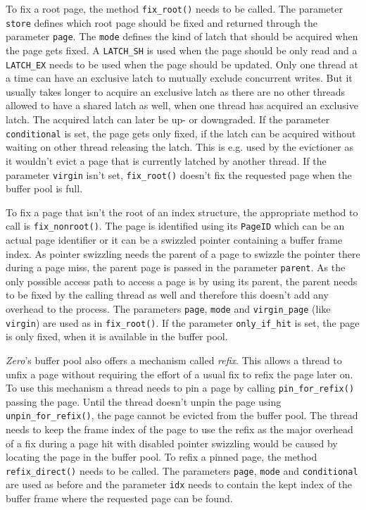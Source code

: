 	To fix a root page, the method \lstinline{fix_root()} needs to be called. The parameter \lstinline{store} defines which root page should be fixed and returned through the parameter \lstinline{page}. The \lstinline{mode} defines the kind of latch that should be acquired when the page gets fixed. A \lstinline{LATCH_SH} is used when the page should be only read and a \lstinline{LATCH_EX} needs to be used when the page should be updated. Only one thread at a time can have an exclusive latch to mutually exclude concurrent writes. But it usually takes longer to acquire an exclusive latch as there are no other threads allowed to have a shared latch as well, when one thread has acquired an exclusive latch. The acquired latch can later be up- or downgraded. If the parameter \lstinline{conditional} is set, the page gets only fixed, if the latch can be acquired without waiting on other thread releasing the latch. This is e.g. used by the evictioner as it wouldn't evict a page that is currently latched by another thread. If the parameter \lstinline{virgin} isn't set, \lstinline{fix_root()} doesn't fix the requested page when the buffer pool is full.

	To fix a page that isn't the root of an index structure, the appropriate method to call is \lstinline{fix_nonroot()}. The page is identified using its \lstinline{PageID} which can be an actual page identifier or it can be a swizzled pointer containing a buffer frame index. As pointer swizzling needs the parent of a page to swizzle the pointer there during a page miss, the parent page is passed in the parameter \lstinline{parent}. As the only possible access path to access a page is by using its parent, the parent needs to be fixed by the calling thread as well and therefore this doesn't add any overhead to the process. The parameters \lstinline{page}, \lstinline{mode} and \lstinline{virgin_page} (like \lstinline{virgin}) are used as in \lstinline{fix_root()}. If the parameter \lstinline{only_if_hit} is set, the page is only fixed, when it is available in the buffer pool.

	\emph{Zero}'s buffer pool also offers a mechanism called \emph{refix}. This allows a thread to unfix a page without requiring the effort of a usual fix to refix the page later on. To use this mechanism a thread needs to pin a page by calling \lstinline{pin_for_refix()} passing the page. Until the thread doesn't unpin the page using \lstinline{unpin_for_refix()}, the page cannot be evicted from the buffer pool. The thread needs to keep the frame index of the page to use the refix as the major overhead of a fix during a page hit with disabled pointer swizzling would be caused by locating the page in the buffer pool. To refix a pinned page, the method \lstinline{refix_direct()} needs to be called. The parameters \lstinline{page}, \lstinline{mode} and \lstinline{conditional} are used as before and the parameter \lstinline{idx} needs to contain the kept index of the buffer frame where the requested page can be found.

